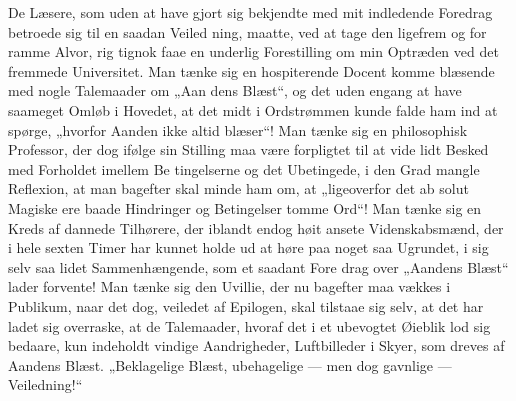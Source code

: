 \documentclass[12pt]{book}
\newcommand{\opage}[1]{\marginnote{\footnotesize\textit{[#1]}}}
\begin{document}
De Læsere, som uden at have gjort sig bekjendte med
mit indledende Foredrag betroede sig til en saadan Veiled\-%
ning, maatte, ved at tage den ligefrem og for ramme Alvor, rig\-%
tignok faae en underlig Forestilling om min Optræden ved
det fremmede Universitet. Man tænke sig en hospiterende
Docent komme blæsende med nogle Talemaader om „Aan\-%
dens Blæst“, og det uden engang at have saameget Omløb i
Hovedet, at det midt i Ordstrømmen kunde falde ham ind at
spørge, „hvorfor Aanden ikke altid blæser“! Man tænke sig
en philosophisk Professor, der dog ifølge sin Stilling maa være
forpligtet til at vide lidt Besked med Forholdet imellem Be\-%
tingelserne og det Ubetingede, i den Grad mangle Reflexion,
at man bagefter skal minde ham om, at „ligeoverfor det ab\-%
solut Magiske ere baade Hindringer og Betingelser tomme
Ord“! Man tænke sig en Kreds af dannede Tilhørere, der\-%
iblandt endog høit ansete Videnskabsmænd, der i hele sexten
Timer har kunnet holde ud at høre paa noget saa Ugrundet,
\opage{313}\setcounter{footnote}{0}%
i sig selv saa lidet Sammenhængende, som et saadant Fore\-%
drag over „Aandens Blæst“ lader forvente! Man tænke sig
den Uvillie, der nu bagefter maa vækkes i Publikum, naar
det dog, veiledet af Epilogen, skal tilstaae sig selv, at det
har ladet sig overraske, at de Talemaader, hvoraf det i et
ubevogtet Øieblik lod sig bedaare, kun indeholdt vindige
Aandrigheder, Luftbilleder i Skyer, som dreves af Aandens
Blæst. „Beklagelige Blæst, ubehagelige --- men dog gavnlige
--- Veiledning!“
\end{document}
